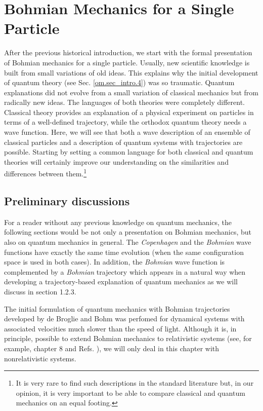 \documentclass[nofootinbib, secnumarabic, amsmath, nobibnotes,10pt,aps,pra]{revtex4-1}
\newcommand{\sref}[1]{Sec. \ref{#1}}
\begin{document}
\vspace*{-1pc}
\section{Bohmian Mechanics for a Single Particle}\label{om.sec_single}

After the previous historical introduction, we start with the formal
presentation of Bohmian mechanics for a single particle. Usually,
new scientific knowledge is built from small variations of old
ideas. This explains why the initial development of quantum theory
(see \sref{om.sec_intro.4}) was so traumatic. Quantum explanations
did not evolve from a small variation of classical mechanics but
from radically new ideas. The languages of both theories were
completely different. Classical theory provides an explanation of a
physical experiment on particles in terms of a well-defined trajectory,
while the orthodox quantum theory needs a wave function. Here, we
will see that both a wave description of an ensemble of classical
particles and a description of quantum systems with trajectories are
possible. Starting by setting a common language for both classical
and quantum theories will certainly improve our understanding on the
similarities and differences between them.\footnote{It is very rare
to find such descriptions in the standard literature but, in our
opinion, it is very important to be able to compare classical and
quantum mechanics on an equal footing.}

\subsection{Preliminary discussions}\label{om.sec_single.1}

For a reader without any previous knowledge on quantum mechanics,
the following sections would be not only a presentation on Bohmian
mechanics, but also on quantum mechanics in general. The \textit{Copenhagen} and the \textit{Bohmian} wave functions have exactly the
same time evolution (when the same configuration space is used in both cases). In addition, the \textit{Bohmian} wave function is
complemented by a \textit{Bohmian} trajectory which appears in a natural
way when developing a trajectory-based explanation of quantum
mechanics as we will discuss in section 1.2.3.


The initial formulation of quantum mechanics with Bohmian
trajectories developed by de Broglie and Bohm was perfomed for dynamical
systems with associated velocities much slower than the speed of
light. Although it is, in principle, possible to extend Bohmian mechanics to
relativistic systems (see, for example, chapter 8 and Refs.
\cite{om.extra6,om.extra7,om.ward}), we will only deal in this
chapter with nonrelativistic systems.
\end{document}
